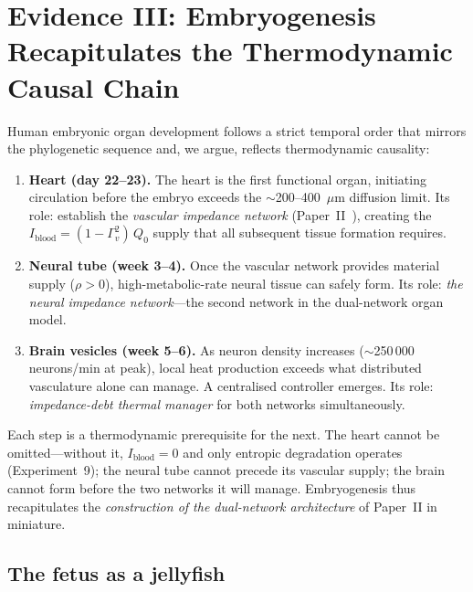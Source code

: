 ﻿\documentclass[aps,pre,twocolumn,superscriptaddress,floatfix]{revtex4-2}
\begin{document}
\section{Evidence III: Embryogenesis Recapitulates the
Thermodynamic Causal Chain}
\label{sec:embryo}

Human embryonic organ development follows a strict
temporal order that mirrors the phylogenetic sequence
and, we argue, reflects thermodynamic causality:

\begin{enumerate}
  \item \textbf{Heart (day 22--23).}
    The heart is the first functional organ,
    initiating circulation before the embryo exceeds
    the $\sim$200--400~$\mu$m diffusion limit.
    Its role: establish the \emph{vascular impedance
    network} (Paper~II~\cite{PaperII}), creating
    the $I_{\mathrm{blood}} = (1-\Gamma_v^2)\,Q_0$
    supply that all subsequent tissue formation requires.
  \item \textbf{Neural tube (week 3--4).}
    Once the vascular network provides material supply
    ($\rho > 0$),
    high-metabolic-rate neural tissue can safely form.
    Its role: \emph{the neural impedance network}---the
    second network in the dual-network organ model.
  \item \textbf{Brain vesicles (week 5--6).}
    As neuron density increases
    ($\sim$250\,000 neurons/min at peak),
    local heat production exceeds what distributed
    vasculature alone can manage.
    A centralised controller emerges.
    Its role: \emph{impedance-debt thermal manager}
    for both networks simultaneously.
\end{enumerate}

Each step is a thermodynamic prerequisite for the next.
The heart cannot be omitted---without it, $I_{\mathrm{blood}}=0$
and only entropic degradation operates (Experiment~9);
the neural tube cannot precede its vascular supply;
the brain cannot form before the two networks it will manage.
Embryogenesis thus recapitulates the \emph{construction of the
dual-network architecture} of Paper~II in miniature.

\subsection{The fetus as a jellyfish}
\label{sec:fetus}
\end{document}
